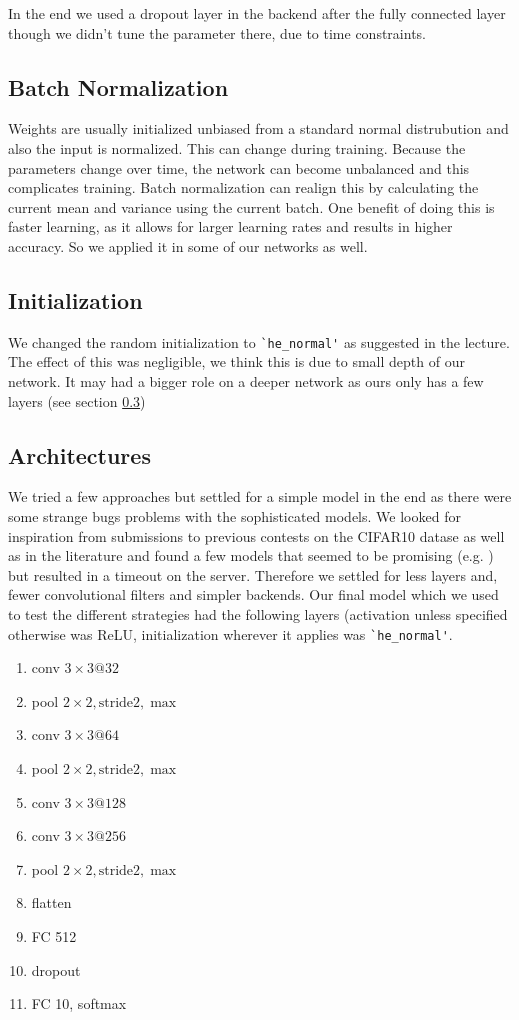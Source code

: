 In the end we used a dropout layer in the backend after the fully connected layer though we didn't tune the parameter there, due to time constraints. 
\subsection{Batch Normalization}
Weights are usually initialized unbiased from a standard normal distrubution and also the input is normalized. This can change during training. Because the parameters change over time, the network can become unbalanced and this complicates training.
Batch normalization can realign this by calculating the current mean and variance using the current batch. One benefit of doing this is faster learning, as it allows for larger learning rates and results in higher accuracy. So we applied  it in some of our networks as well.
\subsection{Initialization}
We changed the random initialization to \lstinline{`he_normal'} \cite{he} as suggested in the lecture. The effect of this was negligible, we think this is due to small depth of our network. It may had a bigger role on a deeper network as ours only has a few layers (see section \ref{sec:a})
\subsection{Architectures}\label{sec:a}
We tried a few approaches but settled for a simple model in the end as there were some strange bugs problems with the sophisticated models. We looked for inspiration from submissions to previous contests on the CIFAR10 datase as well as in the literature and found a few models that seemed to be promising  (e.g. \cite{ref})  but resulted in a timeout on the server. Therefore we settled for less layers and, fewer convolutional filters and simpler backends. 
Our final model which we used to test the different strategies had the following layers (activation unless specified otherwise was ReLU, initialization wherever it applies was \lstinline{`he_normal'}.
\begin{enumerate}
\item conv $3\times 3@32$
\item pool $2\times 2, \text{stride} 2, \max$
\item conv $3\times 3@64$
\item pool $2\times 2, \text{stride} 2, \max$
\item conv $3\times 3@128$
\item conv $3\times 3@256$
\item pool $2\times 2, \text{stride} 2, \max$
\item flatten
\item FC 512
\item dropout
\item FC 10, softmax
\end{enumerate}

